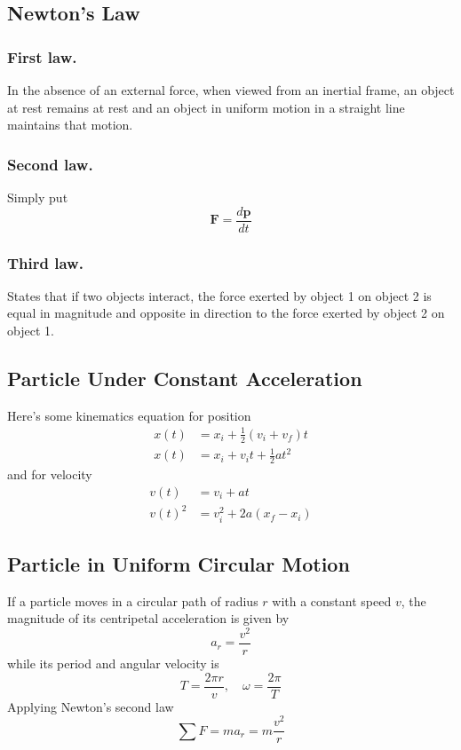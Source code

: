 \documentclass[../../../main.tex]{subfiles}
\begin{document}
\subsection*{Newton's Law}
\subsubsection*{First law.} In the absence of an external force, when viewed from an inertial frame, an object at rest remains at rest and an object in uniform motion in a straight line maintains that motion.

\subsubsection*{Second law.} Simply put 
\begin{equation*}
    \mathbf{F}=\frac{d\mathbf{p}}{dt}
\end{equation*}

\subsubsection*{Third law.} States that if two objects interact, the force exerted by object 1 on object 2 is equal in magnitude and opposite in direction to the force exerted by object 2 on object 1.

\subsection*{Particle Under Constant Acceleration}
Here's some kinematics equation for position
\begin{align*}
    x(t)&=x_i+\frac{1}{2}(v_i+v_f)t\\
    x(t)&=x_i+v_it+\frac{1}{2}at^2
\end{align*}
and for velocity
\begin{align*}
    v(t)&=v_i+at\\
    v(t)^2&=v_i^2+2a(x_f-x_i)
\end{align*}

\subsection*{Particle in Uniform Circular Motion}
If a particle moves in a circular path of radius $r$ with a constant speed $v$, the magnitude of its centripetal acceleration is given by
\begin{equation*}
    a_r=\frac{v^2}{r}
\end{equation*}
while its period and angular velocity is 
\begin{equation*}
    T=\frac{2\pi r}{v},\quad \omega=\frac{2\pi}{T}
\end{equation*}
Applying Newton's second law 
\begin{equation*}
    \sum F=ma_r=m\frac{v^2}{r}
\end{equation*}
\end{document}
